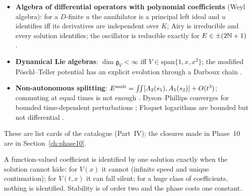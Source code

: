 \begin{itemize}
\item \textbf{Algebra of differential operators with polynomial coefficients} (Weyl algebra): for a $D$-finite $u$ the annihilator is a principal left ideal and $u$ identifies iff its derivatives are independent over $K$; Airy is irreducible and every solution identifies; the oscillator is reducible exactly for $E\in\pm(2\mathbb{N}+1)$ .
\item \textbf{Dynamical Lie algebras}: $\dim\mathfrak g_V<\infty$ iff $V\in\mathrm{span}\{1,x,x^2\}$; the modified P\"oschl--Teller potential has an explicit evolution through a Darboux chain .
\item \textbf{Non-autonomous splitting}: $E^{\rm mult}=\iint[A_2(s_1),A_1(s_2)]+O(t^3)$; commuting at equal times is not enough . Dyson--Phillips converges for bounded time-dependent perturbations ; Floquet logarithms are bounded but not differential .
\end{itemize}
These are list cards of the catalogue (Part~IV); the closures made in Phase~10 are in Section~\ref{ch:phase10}.

\begin{takeaway}
A function-valued coefficient is identified by one solution exactly when the solution cannot hide: for $V(x)$ it cannot (infinite speed and unique continuation); for $V(t,x)$ it can fall silent; for a huge class of coefficients, nothing is identified. Stability is of order two and the phase costs one constant.
\end{takeaway}

